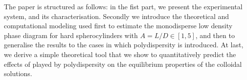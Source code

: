 \documentclass[journal=jacsat,manuscript=article]{achemso}
\begin{document}
%
% 
%


The paper is structured as follows: in the fist part, we present the experimental system, and its characterisation. Secondly we introduce the theoretical and computational modeling used first to  estimate the monodisperse low density phase diagram for hard spherocylinders with  $A=L/D \in [1,5]$, and then to generalise the results to the cases in which polydispersity is introduced. 
At last,  we derive a simple theoretical tool that we show to quantitatively predict the effects of played by polydispersity on the equilibrium properties of the colloidal solutions.  
\end{document}
